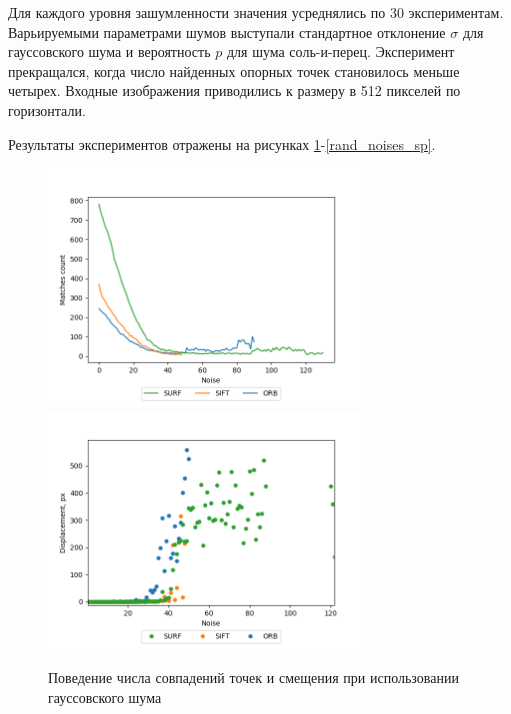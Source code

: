 {{{{   			Для каждого уровня зашумленности значения усреднялись по 30 экспериментам. Варьируемыми параметрами шумов выступали стандартное отклонение $\sigma$ для гауссовского шума и вероятность $p$ для шума соль-и-перец. Эксперимент прекращался, когда число найденных опорных точек становилось меньше четырех. Входные изображения приводились к размеру в 512 пикселей по горизонтали.
   			
   			Результаты экспериментов отражены на рисунках \ref{rand_noises_gauss}-\ref{rand_noises_sp}. 
   			
   			\begin{figure}[H]
   				\centering                             
   				\includegraphics[width=0.75\textwidth,keepaspectratio]{ex2/gauss/Rand_noises_matches.png}   
   				\includegraphics[width=0.75\textwidth,keepaspectratio]{ex2/gauss/Rand_noises_displacement.png}       
   				\centering\caption{ Поведение числа совпадений точек и смещения при использовании гауссовского шума }
   				\label{rand_noises_gauss}                           
   			\end{figure}    
   		
}}}}

